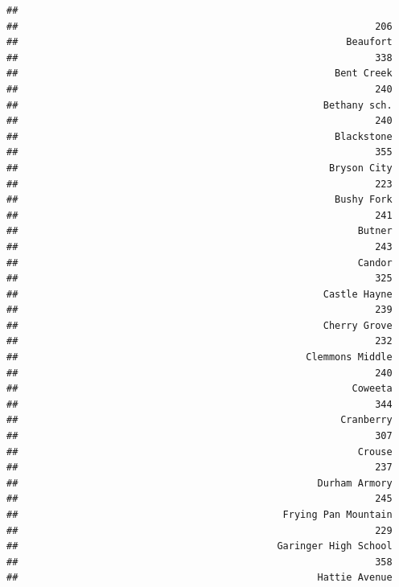\documentclass[12pt,]{article}
\begin{document}
\begin{verbatim}
##                                                                  
##                                                              206 
##                                                         Beaufort 
##                                                              338 
##                                                       Bent Creek 
##                                                              240 
##                                                     Bethany sch. 
##                                                              240 
##                                                       Blackstone 
##                                                              355 
##                                                      Bryson City 
##                                                              223 
##                                                       Bushy Fork 
##                                                              241 
##                                                           Butner 
##                                                              243 
##                                                           Candor 
##                                                              325 
##                                                     Castle Hayne 
##                                                              239 
##                                                     Cherry Grove 
##                                                              232 
##                                                  Clemmons Middle 
##                                                              240 
##                                                          Coweeta 
##                                                              344 
##                                                        Cranberry 
##                                                              307 
##                                                           Crouse 
##                                                              237 
##                                                    Durham Armory 
##                                                              245 
##                                              Frying Pan Mountain 
##                                                              229 
##                                             Garinger High School 
##                                                              358 
##                                                    Hattie Avenue 

\end{verbatim}
\end{document}
